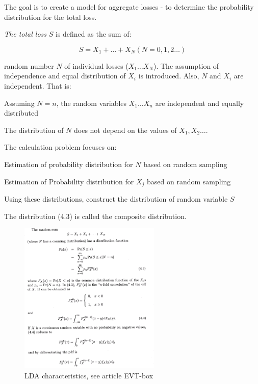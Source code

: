 \documentclass{article}
\begin{document}
The goal is to create a model for aggregate losses - to determine the probability distribution for the total loss.

\emph{The total loss} $S$ is defined as the sum of:

\begin{equation}
  S = X_1+…+X_N (N = 0,1,2 \ldots)
\end{equation}

random number $N$ of individual losses ($X_1 \ldots X_N$). The assumption of independence and equal distribution of $X_i$ is introduced. Also, $N$ and $X_i$ are independent. That is:

\begin{compactitem}
\item Assuming $N = n$, the random variables $X_1 \ldots X_n$ are independent and equally distributed
\item The distribution of $N$ does not depend on the values of $X_1,X_2 \ldots$.
\end{compactitem}

The calculation problem focuses on:
\begin{compactitem}
\item Estimation of probability distribution for $N$ based on random sampling
\item Estimation of Probability distribution for $X_j$ based on random sampling
\item Using these distributions, construct the distribution of random variable $S$
\item The distribution (4.3) is called the composite distribution.
\end{compactitem}


\begin{figure}[H]
  \caption{LDA characteristics, see article EVT-box}
  \centering
    \includegraphics[width=0.6\textwidth]{ldachar}
\end{figure}
\end{document}
